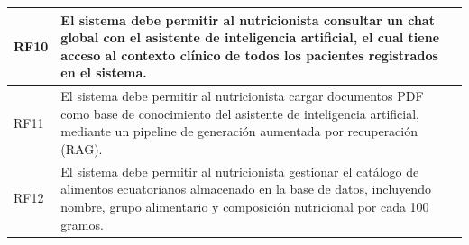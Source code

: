 {\begin{longtable}{|p{1.3cm}|p{12.2cm}|}
RF10 & El sistema debe permitir al nutricionista consultar un chat global con el asistente de inteligencia artificial, el cual tiene acceso al contexto clínico de todos los pacientes registrados en el sistema. \\ \hline
RF11 & El sistema debe permitir al nutricionista cargar documentos PDF como base de conocimiento del asistente de inteligencia artificial, mediante un pipeline de generación aumentada por recuperación (RAG). \\ \hline
RF12 & El sistema debe permitir al nutricionista gestionar el catálogo de alimentos ecuatorianos almacenado en la base de datos, incluyendo nombre, grupo alimentario y composición nutricional por cada 100 gramos. \\ \hline
\end{longtable}
}

